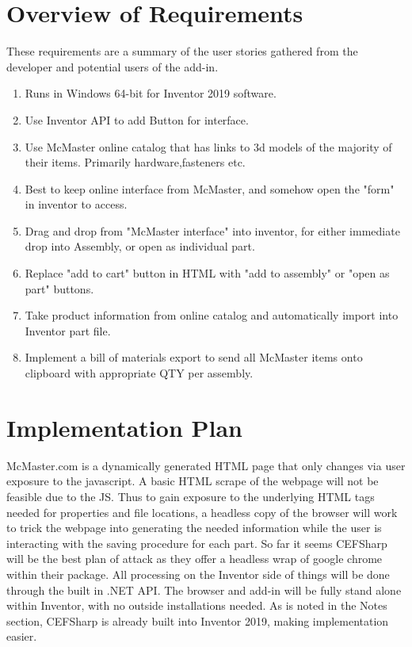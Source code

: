 \documentclass[12pt, letterpaper]{article}
\begin{document}
\section{Overview of Requirements}
These requirements are a summary of the user stories gathered from the developer and potential users of the add-in.
\begin{enumerate}
\item Runs in Windows 64-bit for Inventor 2019 software.
\item Use Inventor API to add Button for interface.
\item Use McMaster online catalog that has links to 3d models of the majority of their items. Primarily hardware,fasteners etc.
\item Best to keep online interface from McMaster, and somehow open the "form" in inventor to access.
\item Drag and drop from "McMaster interface" into inventor, for either immediate drop into Assembly, or open as individual part.
\item Replace "add to cart" button in HTML with "add to assembly" or "open as part" buttons.
\item Take product information from online catalog and automatically import into Inventor part file.
\item Implement a bill of materials export to send all McMaster items onto clipboard with appropriate QTY per assembly.
\end{enumerate}
\section{Implementation Plan}
McMaster.com is a dynamically generated HTML page that only changes via user exposure to the javascript. A basic HTML scrape of the webpage will not be feasible due to the JS. Thus to gain exposure to the underlying HTML tags needed for properties and file locations, a headless copy of the browser will work to trick the webpage into generating the needed information while the user is interacting with the saving procedure for each part. So far it seems CEFSharp will be the best plan of attack as they offer a headless wrap of google chrome within their package. All processing on the Inventor side of things will be done through the built in .NET API. The browser and add-in will be fully stand alone within Inventor, with no outside installations needed. As is noted in the Notes section, CEFSharp is already built into Inventor 2019, making implementation easier.
\end{document}
